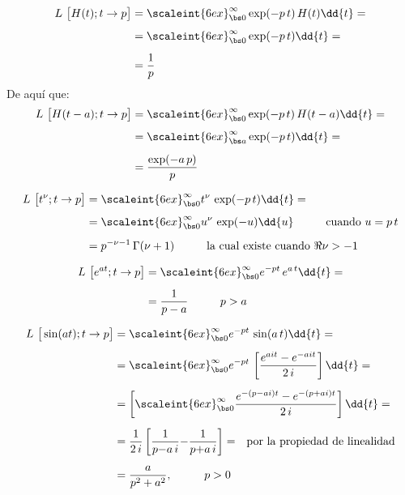 \begin{ejemplo}
\begin{align*}
L \big [H (t); t \to p  \big] &= \scaleint{6ex}_{\bs 0}^{\infty} \exp(- p \, t) \, H (t) \dd{t} = \\[0.5em]
&= \scaleint{6ex}_{\bs 0}^{\infty} \exp(- p \, t) \dd{t} = \\[0.5em]
&= \dfrac{1}{p}
\end{align*}
De aquí que:
\begin{align*}
L \big[  H(t - a); t \to p  \big] &= \scaleint{6ex}_{\bs 0}^{\infty} \exp(- p \, t) \, H (t - a) \dd{t} = \\[0.5em]
&= \scaleint{6ex}_{\bs a}^{\infty} \exp(- p \, t) \dd{t} = \\[0.5em]
&= \dfrac{\exp(-a \, p)}{p}
\end{align*}
\end{ejemplo}
\begin{ejemplo}
\begin{align*}
L \big[  t^{\nu}; t \to p  \big] &= \scaleint{6ex}_{\bs 0}^{\infty} t^{\nu} \, \exp(- p \, t) \dd{t} = \\[0.5em]
&= \scaleint{6ex}_{\bs 0}^{\infty} u^{\nu} \, \exp(-u) \dd{u} \hspace{1cm} \mbox{cuando  } u = p \, t \\[0.5em]
&= p^{-\nu - 1} \, \Gamma (\nu + 1) \hspace{1cm} \mbox{la cual existe cuando  } \Re{\nu} > - 1
\end{align*}
\end{ejemplo}
\begin{ejemplo}
\begin{align*}
L \big[  e^{a t}; t \to p  \big] &= \scaleint{6ex}_{\bs 0}^{\infty} e^{-p t} \, e^{a \, t} \dd{t} = \\[0.5em]
&= \dfrac{1}{p - a} \hspace{1cm} p > a
\end{align*}
\end{ejemplo}
\begin{ejemplo}
\begin{align*}
L \big[  \sin (a t); t \to p  \big] &= \scaleint{6ex}_{\bs 0}^{\infty} e^{-p t} \, \sin (a \, t) \dd{t} = \\[0.5em]
&= \scaleint{6ex}_{\bs 0}^{\infty} e^{-p t} \,\left[ \dfrac{e^{a i t} - e^{- a i t}}{2 \, i} \right] \dd{t} = \\[0.5em]
&= \left[ \scaleint{6ex}_{\bs 0}^{\infty}  \dfrac{e^{-(p - a i) t} - e^{- (p + a i) t}}{2 \, i} \right] \dd{t} = \\[0.5em]
&= \dfrac{1}{2 \, i} \left[ \dfrac{1}{p {-} a \, i} {-} \dfrac{1}{p {+} a \, i} \right] = \hspace{0.25cm} \mbox{por la propiedad de linealidad} \\[0.5em]
&= \dfrac{a}{p^{2} + a^{2}}, \hspace{1cm} p > 0
\end{align*}
\end{ejemplo}
